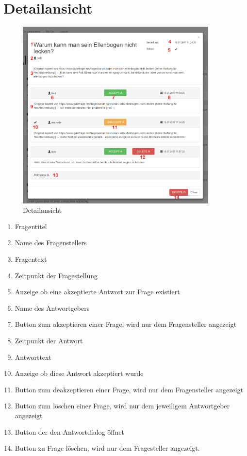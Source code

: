 \documentclass[a4paper]{report}
\begin{document}
\section{Detailansicht}
\begin{figure}[h!]
	\centering
	\includegraphics[width=0.9\textwidth]{FrageMitAntworten.PNG}
	\caption{Detailansicht}
	\label{fig:Detailansicht1}
\end{figure}
\centering\begin{enumerate}
	\item Fragentitel
	\item Name des Fragenstellers
	\item Fragentext
	\item Zeitpunkt der Fragestellung
	\item Anzeige ob eine akzeptierte Antwort zur Frage existiert
	\item Name des Antwortgebers
	\item Button zum akzeptieren einer Frage, wird nur dem Fragensteller angezeigt
	\item Zeitpunkt der Antwort
	\item Antworttext
	\item Anzeige ob diese Antwort akzeptiert wurde
	\item Button zum deakzeptieren einer Frage, wird nur dem Fragensteller angezeigt
	\item Button zum löschen einer Frage, wird nur dem jeweiligem Antwortgeber angezeigt
	\item Button der den Antwortdialog öffnet
	\item Button zu Frage löschen, wird nur dem Fragesteller angezeigt. 
\end{enumerate}
\end{document}
